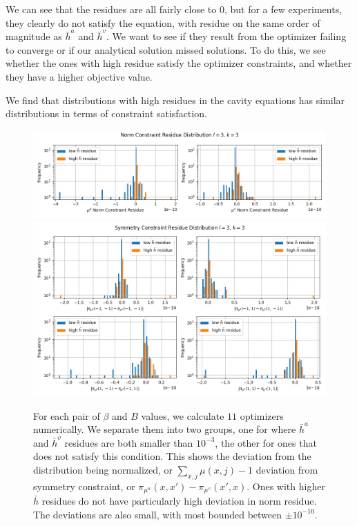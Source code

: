 \documentclass[12pt]{article}
\numberwithin{equation}{section}
\begin{document}
\newpage

We can see that the residues are all fairly close to $0$, but for a few experiments, they clearly do not satisfy the equation, with residue
on the same order of magnitude as $\bar{h}^a$ and $\bar{h}^v$. We want to see if they result from the optimizer failing to converge
or if our analytical solution missed solutions. To do this, we see whether the ones with high residue satisfy the optimizer constraints,
and whether they have a higher objective value.

We find that distributions with high residues in the cavity equations has similar distributions in terms of constraint satisfaction.
\begin{figure}[h]
    \centering
    \includegraphics[width=15cm]{img/Ising_bptt/NC_l=3_k=3.png}
    \includegraphics[width=15cm]{img/Ising_bptt/SC_l=3_k=3.png}
    \caption{For each pair of $\beta$ and $B$ values, we calculate $11$ optimizers numerically.
        We separate them into two groups, one for where $\bar{h}^a$ and $\bar{h}^v$ residues are both smaller than $10^{-3}$,
        the other for ones that does not satisfy this condition. This shows the deviation from the distribution being normalized, or
        $\sum_{x, j} \mu(x, j) - 1$ deviation from symmetry constraint, or $\pi_{\mu^a}(x, x') - \pi_{\mu^v}(x', x)$.
        Ones with higher $\bar{h}$ residues do not have particularly high deviation in norm residue.
        The deviations are also small, with most bounded between $\pm 10^{-10}$.}
    \label{Fig.ISBP-NC-l3k3}
\end{figure}
\end{document}
